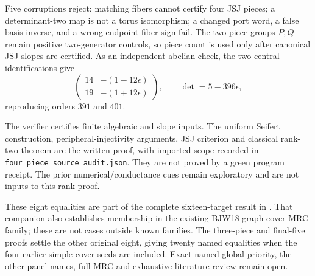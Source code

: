 \documentclass[11pt]{article}
\begin{document}
Five corruptions reject: matching fibers cannot certify four JSJ pieces;
a determinant-two map is not a torus isomorphism; a changed port word,
a false basis inverse, and a wrong endpoint fiber sign fail. The
two-piece groups $P,Q$ remain positive two-generator controls, so piece
count is used only after canonical JSJ slopes are certified. As an
independent abelian check, the two central identifications give
\[
 \begin{pmatrix}14&-(1-12\epsilon)\\19&-(1+12\epsilon)\end{pmatrix},
 \qquad \det=5-396\epsilon,
\]
reproducing orders $391$ and $401$.

The verifier certifies finite algebraic and slope inputs. The uniform
Seifert construction, peripheral-injectivity arguments, JSJ criterion
and classical rank-two theorem are the written proof, with imported
scope recorded in \texttt{four\_piece\_source\_audit.json}. They are
not proved by a green program receipt. The prior numerical/conductance
cues remain exploratory and are not inputs to this rank proof.

These eight equalities are part of the complete sixteen-target result
in . That companion
also establishes membership in the existing BJW18 graph-cover MRC family;
these are not cases outside known families. The three-piece and final-five
proofs settle the other original eight, giving twenty named equalities
when the four earlier simple-cover seeds are included. Exact named global
priority, the other panel names, full MRC and exhaustive literature review
remain open.
\end{document}
